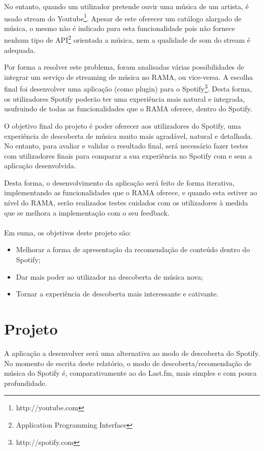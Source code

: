 No entanto, quando um utilizador pretende ouvir uma música de um artista, é usado stream do Youtube\footnote{http://youtube.com}. 
Apesar de este oferecer um catálogo alargado de música, o mesmo não é indicado para esta funcionalidade pois não fornece nenhum tipo de API\footnote{Application Programming Interface} orientada a música, nem a qualidade de som do stream é adequada.

Por forma a resolver este problema, foram analisadas várias possibilidades de integrar um serviço de streaming de música no RAMA, ou vice-versa.
A escolha final foi desenvolver uma aplicação (como plugin) para o Spotify\footnote{http://spotify.com}.
Desta forma, os utilizadores Spotify poderão ter uma experiência mais natural e integrada, usufruindo de todas as funcionalidades que o RAMA oferece, dentro do Spotify.


O objetivo final do projeto é poder oferecer aos utilizadores do Spotify, uma experiência de descoberta de música muito mais agradável, natural e detalhada.
No entanto, para avaliar e validar o resultado final, será necessário fazer testes com utilizadores finais para comparar a sua experiência no Spotify com e sem a aplicação desenvolvida.

Desta forma, o desenvolvimento da aplicação será feito de forma iterativa, implementando as funcionalidades que o RAMA oferece, e quando esta estiver ao nível do RAMA, serão realizados testes cuidados com os utilizadores à medida que se melhora a implementação com o seu feedback.
 \\
 \\
Em suma, os objetivos deste projeto são:

\begin{itemize}
  \item Melhorar a forma de apresentação da recomendação de conteúdo dentro do Spotify;
  \item Dar mais poder ao utilizador na descoberta de música nova;
  \item Tornar a experiência de descoberta mais interessante e cativante.
\end{itemize}

\section{Projeto} \label{sec:proj}

A aplicação a desenvolver será uma alternativa ao modo de descoberta do Spotify.
No momento de escrita deste relatório, o modo de descoberta/recomendação de música do Spotify é, comparativamente ao do Last.fm, mais simples e com pouca profundidade.

